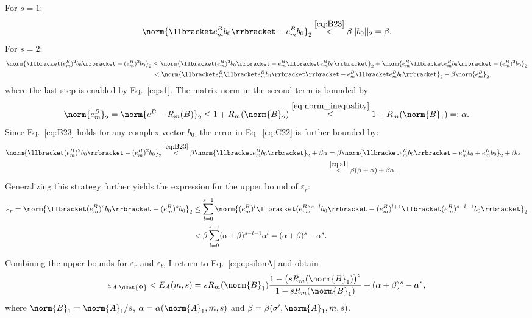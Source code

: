 For $s=1$: 
\begin{equation}
\label{eq:s1}
    \norm{\llbracket e^B_mb_0\rrbracket-e^B_mb_0 }_2\overset{\eqref{eq:B23}}{<}\beta||b_0||_2=\beta.
\end{equation}
For $s=2$:
\begin{align}
\label{eq:C22}
\nonumber    \norm{\llbracket (e^B_m)^2b_0\rrbracket-(e^B_m)^2b_0 }_2 &\leq\norm{\llbracket (e^B_m)^2b_0\rrbracket-     
    e^B_m\llbracket e^B_mb_0\rrbracket}_2+\norm{e^B_m\llbracket e^B_mb_0\rrbracket-(e^B_m)^2b_0}_2\\
   &\, <\norm{\llbracket e^B_m \llbracket e^B_mb_0\rrbracket\rrbracket-     
    e^B_m\llbracket e^B_mb_0\rrbracket}_2+\beta\norm{e^B_m}_2,
\end{align} 
where the last step is enabled by Eq.~\eqref{eq:s1}.
The matrix norm in the second term is bounded by
\begin{equation}
    \norm{e^B_m}_2=\norm{e^B-R_m(B)}_2\leq 1+R_m(\norm{B}_2)\overset{\eqref{eq:norm_inequality}}{\leq} 1+R_m(\norm{B}_1)=:\alpha.
\end{equation}
Since Eq.~\eqref{eq:B23} holds for any complex vector $b_0$, the error in Eq.~\eqref{eq:C22} is further bounded by:
\begin{align}
    \norm{\llbracket (e^B_m)^2b_0\rrbracket-(e^B_m)^2b_0 }_2\overset{\eqref{eq:B23}}{<}\beta\norm{\llbracket e^B_mb_0\rrbracket}_2+\beta\alpha &=\beta\norm{\llbracket e^B_mb_0\rrbracket-e^B_mb_0+e^B_mb_0}_2+\beta\alpha\quad\\
    &\overset{\eqref{eq:s1}}{<}\beta(\beta+\alpha)+\beta\alpha.
\end{align}
Generalizing this strategy further yields the expression for the upper bound of $\varepsilon_r$: 
\begin{align}
\label{eq:rounding}
\nonumber    \varepsilon_r=\norm{\llbracket (e^B_m)^sb_0\rrbracket-(e^B_m)^sb_0 }_2 &\leq \sum_{l=0}^{s-1}\norm{(e^B_m)^l \llbracket (e^B_m)^{s-l}b_0\rrbracket-(e^B_m)^{l+1}\llbracket (e^B_m)^{s-l-1}b_0\rrbracket}_2\\
    &<\beta\sum_{l=0}^{s-1}(\alpha+\beta)^{s-l-1}\alpha^{l}=(\alpha+\beta)^s-\alpha^s.
\end{align}    

Combining the upper bounds for $\varepsilon_r$ and $\varepsilon_t$, I return to Eq.~\eqref{eq:epsilonA} and obtain
\begin{equation}
\label{eq:overallupperbound}
\varepsilon_{A,\dket{\Psi}}< E_A(m,s)=sR_m(\norm{B}_1)\frac{1-\big(sR_m(\norm{B}_1)\big)^s}{1-sR_m(\norm{B}_1)}+(\alpha+\beta)^s-\alpha^s,
\end{equation}
where $\norm{B}_1=\norm{A}_1/s$, $\alpha=\alpha(\norm{A}_1,m,s)$ and $\beta=\beta(\sigma',\norm{A}_1,m,s)$.

